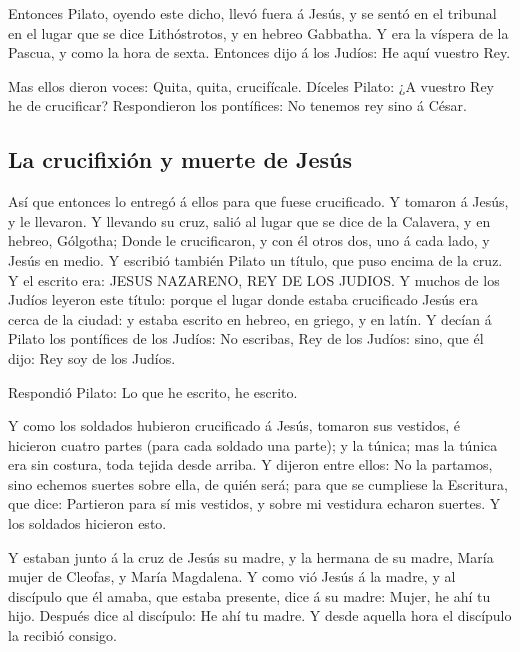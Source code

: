  Entonces Pilato, oyendo este dicho, llevó fuera á Jesús, y
se sentó en el tribunal en el lugar que se dice Lithóstrotos, y en
hebreo Gabbatha.  Y era la víspera de la Pascua, y como la
hora de sexta. Entonces dijo á los Judíos: He aquí vuestro Rey.

 Mas ellos dieron voces: Quita, quita, crucifícale. Díceles
Pilato: ¿A vuestro Rey he de crucificar? Respondieron los pontífices: No
tenemos rey sino á César.

\hypertarget{la-crucifixiuxf3n-y-muerte-de-jesuxfas}{%
\subsection{La crucifixión y muerte de
Jesús}\label{la-crucifixiuxf3n-y-muerte-de-jesuxfas}}

 Así que entonces lo entregó á ellos para que fuese
crucificado. Y tomaron á Jesús, y le llevaron.  Y llevando
su cruz, salió al lugar que se dice de la Calavera, y en hebreo,
Gólgotha;  Donde le crucificaron, y con él otros dos, uno á
cada lado, y Jesús en medio.  Y escribió también Pilato un
título, que puso encima de la cruz. Y el escrito era: JESUS NAZARENO,
REY DE LOS JUDIOS.  Y muchos de los Judíos leyeron este
título: porque el lugar donde estaba crucificado Jesús era cerca de la
ciudad: y estaba escrito en hebreo, en griego, y en latín. 
Y decían á Pilato los pontífices de los Judíos: No escribas, Rey de los
Judíos: sino, que él dijo: Rey soy de los Judíos.

 Respondió Pilato: Lo que he escrito, he escrito.

 Y como los soldados hubieron crucificado á Jesús, tomaron
sus vestidos, é hicieron cuatro partes (para cada soldado una parte); y
la túnica; mas la túnica era sin costura, toda tejida desde arriba.
 Y dijeron entre ellos: No la partamos, sino echemos
suertes sobre ella, de quién será; para que se cumpliese la Escritura,
que dice: Partieron para sí mis vestidos, y sobre mi vestidura echaron
suertes. Y los soldados hicieron esto.

 Y estaban junto á la cruz de Jesús su madre, y la hermana
de su madre, María mujer de Cleofas, y María Magdalena.  Y
como vió Jesús á la madre, y al discípulo que él amaba, que estaba
presente, dice á su madre: Mujer, he ahí tu hijo.  Después
dice al discípulo: He ahí tu madre. Y desde aquella hora el discípulo la
recibió consigo.

